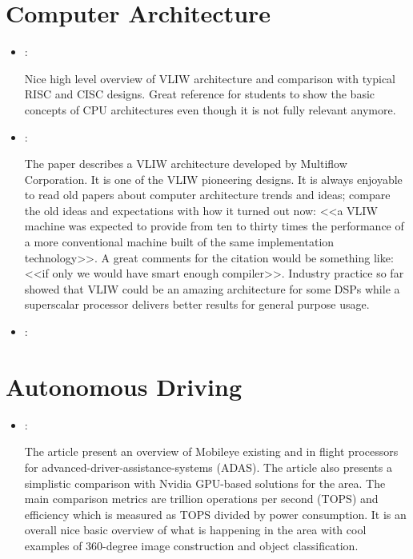 \section*{Computer Architecture}
\begin{itemize}
    \item \cite{Philips:VLIW:1997}:

    Nice high level overview of VLIW architecture and comparison with typical RISC and CISC designs. Great reference for students to show the basic concepts of CPU architectures even though it is not fully relevant anymore.

    \item \cite{Colwell:Multiflow-VLIW:1987}:

    The paper describes a VLIW architecture developed by Multiflow Corporation. It is one of the VLIW pioneering designs. It is always enjoyable to read old papers about computer architecture trends and ideas; compare the old ideas and expectations with how it turned out now: <<a VLIW machine was expected to provide from ten to thirty times the performance of a more conventional machine built of the same implementation technology>>. A great comments for the citation would be something like: <<if only we would have smart enough compiler>>. Industry practice so far showed that VLIW could be an amazing architecture for some DSPs while a superscalar processor delivers better results for general purpose usage.

    \item \cite{Rajwar:SpeculativeLockElision:2001}:

\end{itemize}

\section*{Autonomous Driving}
\begin{itemize}
    \item \cite{Delmer:Mobileye:2019}:

    The article present an overview of Mobileye existing and in flight processors for advanced-driver-assistance-systems (ADAS). The article also presents a simplistic comparison with Nvidia GPU-based solutions for the area. The main comparison metrics are trillion operations per second (TOPS) and efficiency which is measured as TOPS divided by power consumption. It is an overall nice basic overview of what is happening in the area with cool examples of 360-degree image construction and object classification.
\end{itemize}

